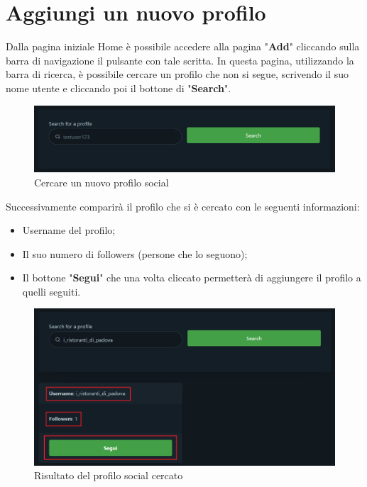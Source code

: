 \section{Aggiungi un nuovo profilo} {
    Dalla pagina iniziale Home è possibile accedere alla pagina "\textbf{Add}" cliccando sulla barra di navigazione il pulsante con tale scritta.
    \aCapo
    In questa pagina, utilizzando la barra di ricerca, è possibile cercare un profilo che non si segue, scrivendo il suo nome utente e cliccando poi il bottone di "\textbf{Search}". 
    
    \begin{figure}[H]
        \includegraphics[width=12cm]{sezioni/images/add.png}
        \centering
        \caption{Cercare un nuovo profilo social}
    \end{figure}
    
    Successivamente comparirà il profilo che si è cercato con le seguenti informazioni:
    \begin{itemize}
        \item Username del profilo;
        \item Il suo numero di followers (persone che lo seguono);
        \item Il bottone "\textbf{Segui}" che una volta cliccato permetterà di aggiungere il profilo a quelli seguiti.
    \end{itemize}

    \begin{figure}[H]
        \includegraphics[width=12cm]{sezioni/images/risultato-add.png}
        \centering
        \caption{Risultato del profilo social cercato}
    \end{figure}

}
